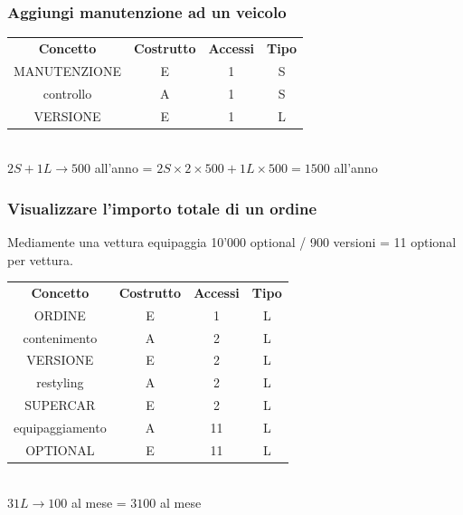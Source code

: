 \documentclass[11pt]{article}
\begin{document}
\subsubsection{Aggiungi manutenzione ad un veicolo} 

\begin{table}[H]
    \centering
    \begin{tabular}{c c c c}
        \rowcolor{red!20!}
        \textbf{Concetto} & \textbf{Costrutto} & \textbf{Accessi} &
        \textbf{Tipo}\\
        MANUTENZIONE & E & 1 & S \\
        controllo & A & 1 & S \\
        VERSIONE & E & 1 & L \\
    \end{tabular}\\
    \( 2S  + 1L \rightarrow  500\) all'anno = \( 2S \times 2 \times 500 + 1L
    \times 500 = 1500 \) all'anno
\end{table}

\subsubsection{Visualizzare l'importo totale di un ordine} 

Mediamente una vettura equipaggia 10'000 optional / 900 versioni = 11 optional per vettura.

\begin{table}[H]
    \centering
    \begin{tabular}{c c c c}
        \rowcolor{red!20!}
        \textbf{Concetto} & \textbf{Costrutto} & \textbf{Accessi} &
        \textbf{Tipo}\\
        ORDINE & E & 1 & L \\
        contenimento & A & 2 & L \\
        VERSIONE & E & 2 & L \\
        restyling & A & 2 & L \\
        SUPERCAR & E & 2 & L \\
        equipaggiamento & A & 11 & L \\
        OPTIONAL & E & 11 & L \\
    \end{tabular}\\
    \( 31L \rightarrow 100 \) al mese = \( 3100 \) al mese
\end{table}
\end{document}
